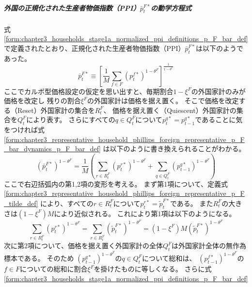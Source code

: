 \subparagraph{外国の正規化された生産者物価指数（PPI）\(\bar{p}_t^{F*}\)の動学方程式}
\label{sec:chapter3_representative_household_phillips_foreign_representative_p_F_bar_dynamics}
式
\eqref{form:chapter3_households_stage1a_normalized_ppi_definitions_p_F_bar_def}
で定義されたとおり、正規化された生産者物価指数（PPI）\(\bar{p}_t^{F*}\)は以下のようであった。
\begin{equation}
\label{form:chapter3_representative_household_phillips_foreign_representative_p_F_bar_dynamics_p_F_bar_def}
    \bar{p}_t^{F*}
    \equiv\left[\frac{1}{M}\sum_{f\in F}(p_t^{f*})^{1-\theta^F}\right]^{\frac{1}{1-\theta^F}}
\end{equation}
ここでカルボ型価格設定の仮定を思い出すと、毎期割合\(1-\xi^F\)の外国家計のみが価格を改定し
残りの割合\(\xi^F\)の外国家計は価格を据え置く。
そこで価格を改定する（Reset）外国家計の集合を\(R_t^F\)、
価格を据え置く（Quiescent）外国家計の集合を\(Q_t^F\)により表す。
さらにすべての\(q\in Q_t^F\)について\(p_t^{q*}=p_{t-1}^{q*}\)であることに気をつければ式
\eqref{form:chapter3_representative_household_phillips_foreign_representative_p_F_bar_dynamics_p_F_bar_def}
は以下のように書き換えられることがわかる。
\begin{equation}
\label{form:chapter3_representative_household_phillips_foreign_representative_p_F_bar_dynamics_p_F_bar_modified_eq}
    (\bar{p}_t^{F*})^{1-\theta^F}
    =\frac{1}{M}
     \left(\sum_{r\in R_t^F}(p_t^{r*})^{1-\theta^F}+\sum_{q\in Q_t^F}(p_{t-1}^{q*})^{1-\theta^F}\right)
\end{equation}
ここで右辺括弧内の第1,2項の変形を考える。
まず第1項について、定義式
\eqref{form:chapter3_representative_household_phillips_foreign_representative_p_F_tilde_def}
により、すべての\(r\in R_t^F\)について\(p_t^{r*}=\widetilde{p}_t^{F*}\)である。
また\(R_t^F\)の大きさは\((1-\xi^F)M\)により近似される。
これにより第1項は以下のようになる。
\begin{equation}
\label{form:chapter3_representative_household_phillips_foreign_representative_p_F_bar_dynamics_p_F_bar_modified_first_term_eq}
    \sum_{r\in R_t^F}(p_t^{r*})^{1-\theta^F}
    =\sum_{r\in R_t^F}(\widetilde{p}_t^{F*})^{1-\theta^F}
    =(1-\xi^F)M(\widetilde{p}_t^{F*})^{1-\theta^F}
\end{equation}
次に第2項について、価格を据え置く外国家計の全体\(Q_t^F\)は外国家計全体の無作為標本である。
そのため
\((p_{t-1}^{q*})^{1-\theta^F}\)の\(q\in Q_t^F\)について総和は、
\((p_{t-1}^{f*})^{1-\theta^F}\)の\(f\in F\)についての総和に割合\(\xi^F\)を掛けたものに等しくなる。
さらに式
\eqref{form:chapter3_households_stage1a_normalized_ppi_definitions_p_F_bar_def}
